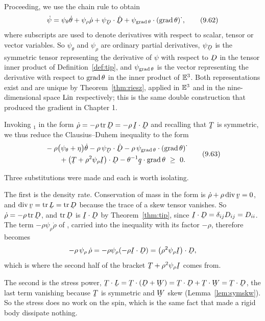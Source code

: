 Proceeding, we use the chain rule to obtain
\begin{equation}
   \dot\psi=\psi_{\theta}\dot\theta+\psi_{\rho}\dot\rho
   +\ip{\psi_{\bD}}{\dot\bD}
   +\ip{\psi_{\grad\theta}}{(\grad\theta)^{\textstyle\cdot}},
   \tag{9.62}\label{eq:9.62}
\end{equation}
where subscripts are used to denote derivatives with respect to scalar,
tensor or vector variables. So $\psi_{\theta}$ and $\psi_{\rho}$ are
ordinary partial derivatives, $\psi_{\bD}$ is the symmetric tensor
representing the derivative of $\psi$ with respect to $\bD$ in the
tensor inner product of Definition~\ref{def:tip}, and
$\psi_{\operatorname{grad}\theta}$ is the vector representing the derivative with
respect to $\operatorname{grad}\theta$ in the inner product of $\mathbb{E}^{3}$. Both
representations exist and are unique by Theorem~\ref{thm:riesz}, applied
in $\mathbb{E}^{3}$ and in the nine-dimensional space $\operatorname{Lin}$ respectively; this is
the same double construction that produced the gradient in Chapter 1.

Invoking $_{1}$ in the form $\dot\rho=-\rho\tr\bD
=-\rho\,\ip\I\bD$ and recalling that $\bT$ is symmetric, we thus reduce
the Clausius--Duhem inequality to the form
\begin{equation}
\begin{aligned}
   &-\rho\big(\psi_{\theta}+\eta\big)\dot\theta
   -\rho\,\ip{\psi_{\bD}}{\dot\bD}
   -\rho\,\ip{\psi_{\grad\theta}}{(\grad\theta)^{\textstyle\cdot}}\\
   &\qquad+\ip{\big(\bT+\rho^{2}\psi_{\rho}\I\big)}\bD
   -\theta^{-1}\ip\bq{\grad\theta}\ \geq\ 0 .
\end{aligned}
   \tag{9.63}\label{eq:9.63}
\end{equation}

Three substitutions were made and each is worth isolating.

The first is the density rate. Conservation of mass in the form
 is
$\dot\rho+\rho\dvg\bv=0$, and $\dvg\bv=\tr\bL=\tr\bD$ because the trace
of a skew tensor vanishes. So $\dot\rho=-\rho\tr\bD$, and $\tr\bD$ is
$\ip\I\bD$ by Theorem~\ref{thm:tip}, since $\ip\I\bD=\dd_{ij}D_{ij}
=D_{ii}$. The term $-\rho\psi_{\rho}\dot\rho$ of , carried
into the inequality with its factor $-\rho$, therefore becomes
\[
   -\rho\,\psi_{\rho}\,\dot\rho=-\rho\psi_{\rho}(-\rho\ip\I\bD)
   =\ip{\big(\rho^{2}\psi_{\rho}\I\big)}\bD ,
\]
which is where the second half of the bracket
$\bT+\rho^{2}\psi_{\rho}\I$ comes from.

The second is the stress power, $\ip\bT\bL=\ip\bT{(\bD+\bW)}
=\ip\bT\bD+\ip\bT\bW=\ip\bT\bD$, the last term vanishing because $\bT$
is symmetric and $\bW$ skew (Lemma~\ref{lem:symskw}). So the stress
does no work on the spin, which is the same fact that made a rigid body
dissipate nothing.

